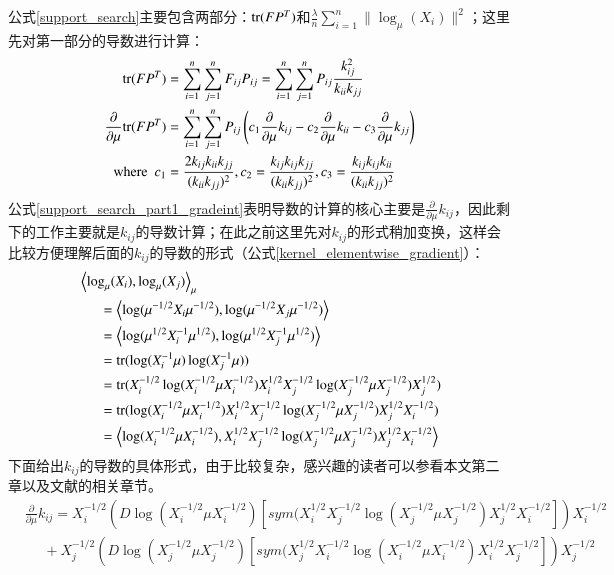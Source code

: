 公式\ref{support_search}主要包含两部分：${\rm tr}(FP^{T})$和$\frac{\lambda}{n}\sum_{i=1}^{n} \|\log_{\mu}(X_i)\|^2$；这里先对第一部分的导数进行计算：
\begin{equation}
\label{support_search_part1_gradeint}
\begin{split}
{\rm tr}(FP^{T})&=\sum_{i=1}^{n}\sum_{j=1}^{n}F_{ij}P_{ij}=\sum_{i=1}^{n}\sum_{j=1}^{n}P_{ij}\frac{k_{ij}^2}{k_{ii}k_{jj}}\\
\frac{\partial}{\partial \mu}{\rm tr}(FP^{T})&=\sum_{i=1}^{n}\sum_{j=1}^{n}P_{ij}\left(c_1\frac{\partial}{\partial \mu}k_{ij}-c_2\frac{\partial}{\partial \mu}k_{ii}-c_3\frac{\partial}{\partial \mu}k_{jj}\right)\\
{\rm where~~}c_1&=\frac{2k_{ij}k_{ii}k_{jj}}{(k_{ii}k_{jj})^2},c_2=\frac{k_{ij}k_{ij}k_{jj}}{(k_{ii}k_{jj})^2},c_3=\frac{k_{ij}k_{ij}k_{ii}}{(k_{ii}k_{jj})^2}
\end{split}
\end{equation}
公式\ref{support_search_part1_gradeint}表明导数的计算的核心主要是$\frac{\partial}{\partial \mu}k_{ij}$，因此剩下的工作主要就是$k_{ij}$的导数计算；在此之前这里先对$k_{ij}$的形式稍加变换，这样会比较方便理解后面的$k_{ij}$的导数的形式（公式\ref{kernel_elementwise_gradient}）：
\begin{equation}
\label{kernel_elementwise}
\begin{split}
&\left<\log_{\mu}(X_i),\log_{\mu}(X_j)\right>_{\mu}\\
&~~~~~~=\left<\log(\mu^{-1/2}X_{i}\mu^{-1/2}),\log(\mu^{-1/2}X_j\mu^{-1/2})\right>\\
&~~~~~~=\left<\log(\mu^{1/2}X_{i}^{-1}\mu^{1/2}),\log(\mu^{1/2}X_{j}^{-1}\mu^{1/2})\right>\\
&~~~~~~={\rm tr}(\log(X_{i}^{-1}\mu)\log(X_{j}^{-1}\mu))\\
&~~~~~~={\rm tr}(X_{i}^{-1/2}\log(X_{i}^{-1/2}\mu X_{i}^{-1/2})X_{i}^{1/2}X_{j}^{-1/2}\log(X_{j}^{-1/2}\mu X_{j}^{-1/2})X_{j}^{1/2})\\
&~~~~~~={\rm tr}(\log(X_{i}^{-1/2}\mu X_{i}^{-1/2})X_{i}^{1/2}X_{j}^{-1/2}\log(X_{j}^{-1/2}\mu X_{j}^{-1/2})X_{j}^{1/2}X_{i}^{-1/2})\\
&~~~~~~=\left<\log(X_{i}^{-1/2}\mu X_{i}^{-1/2}),X_{i}^{1/2}X_{j}^{-1/2}\log(X_{j}^{-1/2}\mu X_{j}^{-1/2})X_{j}^{1/2}X_{i}^{-1/2}\right>\\
\end{split}
\end{equation}
下面给出$k_{ij}$的导数的具体形式，由于比较复杂，感兴趣的读者可以参看本文第二章以及文献\cite{Maniopt_DiscreteCurveFitting,Statistics_SLEDML}的相关章节。
\begin{equation}
\label{kernel_elementwise_gradient}
\begin{split}
&\frac{\partial}{\partial \mu}k_{ij}=X_{i}^{-1/2}\left(D\log(X_{i}^{-1/2}\mu X_{i}^{-1/2})[sym(X_{i}^{1/2}X_{j}^{-1/2}\log(X_{j}^{-1/2}\mu X_{j}^{-1/2})X_{j}^{1/2}X_{i}^{-1/2}]\right)X_{i}^{-1/2}\\
&~~~~~~+X_{j}^{-1/2}\left(D\log(X_{j}^{-1/2}\mu X_{j}^{-1/2})[sym(X_{j}^{1/2}X_{i}^{-1/2}\log(X_{i}^{-1/2}\mu X_{i}^{-1/2})X_{i}^{1/2}X_{j}^{-1/2}]\right)X_{j}^{-1/2}\\
\end{split}
\end{equation}

